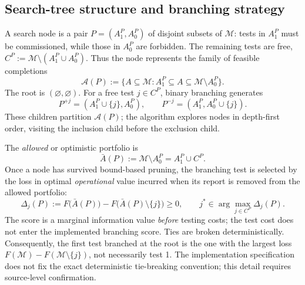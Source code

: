 \documentclass[11pt,a4paper]{article}
\newcommand{\calM}{\mathcal{M}}
\begin{document}
\subsection{Search-tree structure and branching strategy}\label{sec:branching}
A search node is a pair $P=(A_1^P,A_0^P)$ of disjoint subsets of $\calM$: tests in $A_1^P$ must be commissioned, while those in $A_0^P$ are forbidden. The remaining tests are free, $C^P:=\calM\setminus(A_1^P\cup A_0^P)$. Thus the node represents the family of feasible completions
\begin{equation}\label{eq:nodefeas}
 \mathscr{A}(P):=\{A\subseteq\calM:A_1^P\subseteq A\subseteq\calM\setminus A_0^P\}.
\end{equation}
The root is $(\varnothing,\varnothing)$. For a free test $j\in C^P$, binary branching generates
\begin{equation}\label{eq:children}
 P^{+j}=(A_1^P\cup\{j\},A_0^P),\qquad
 P^{-j}=(A_1^P,A_0^P\cup\{j\}).
\end{equation}
These children partition $\mathscr A(P)$; the algorithm explores nodes in depth-first order, visiting the inclusion child before the exclusion child.

The \emph{allowed} or optimistic portfolio is
\begin{equation}\label{eq:completion}
 \bar A(P):=\calM\setminus A_0^P=A_1^P\cup C^P.
\end{equation}
Once a node has survived bound-based pruning, the branching test is selected by the loss in optimal \emph{operational} value incurred when its report is removed from the allowed portfolio:
\begin{equation}\label{eq:branchscore}
 \Delta_j(P):=F\bigl(\bar A(P)\bigr)
          -F\bigl(\bar A(P)\setminus\{j\}\bigr)\ge 0,
 \qquad
 j^*\in\arg\max_{j\in C^P}\Delta_j(P).
\end{equation}
The score is a marginal information value \emph{before} testing costs; the test cost does not enter the implemented branching score. Ties are broken deterministically. Consequently, the first test branched at the root is the one with the largest loss $F(\calM)-F(\calM\setminus\{j\})$, not necessarily test 1. The implementation specification does not fix the exact deterministic tie-breaking convention; this detail requires source-level confirmation.
\end{document}

